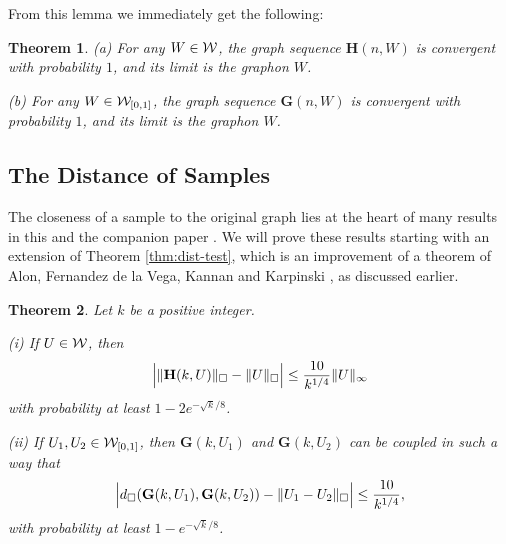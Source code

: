 \documentclass[12pt]{article}
\newtheorem{theorem}{Theorem}[section]
\numberwithin{equation}{section}
\def\bG{{\mathbf G}}
\def\bH{{\mathbf H}}
\def\WWz{{\WW_{[0,1]}}}
\begin{document}
From this lemma we immediately get the following:

\begin{theorem}\label{WRAND-CONV}
{\rm (a)} For any $W\in{\cal W}$, the graph sequence $\bH(n,W)$ is
convergent with probability $1$, and its limit is the graphon $W$.



{\rm (b)} For any $W\in\WWz$, the graph sequence $\bG(n,W)$ is
convergent with probability $1$, and its limit is the graphon $W$.
\end{theorem}


\subsection{The Distance of Samples}
\label{sec:dist-sample-W}



The closeness of a sample to the original graph lies at the heart of
many results in this and the companion paper \cite{dense2}.  We will
prove these results starting with an extension of Theorem
\ref{thm:dist-test}, which is an improvement of a theorem of Alon,
Fernandez de la Vega, Kannan and Karpinski \cite{AFKK,AFKK-Stoc},
as discussed earlier.

\begin{theorem}\label{thm:NormSample}
Let $k$ be a positive integer.

\smallskip

{\rm (i)} If $U\in{\cal W}$, then
\begin{equation}
\label{ProbH-UpBd}
\Bigl|\|\bH(k,U)\|_\square -\|U\|_\square\Bigr|
\leq \frac {10} {k^{1/4}}\|U\|_\infty
\end{equation}
with probability at least $1-2e^{-\sqrt k/8}$.

\smallskip

{\rm (ii)} If $U_1,U_2\in\WWz$, then $\bG(k,U_1)$ and $\bG(k,U_2)$
can be coupled in such a way that
\begin{equation}
\label{ProbG1G2-diff}
\Bigl|
d_\square(\bG(k,U_1),\bG(k,U_2))-\|U_1-U_2\|_\square
\Bigr|\leq \frac{10}{k^{1/4}},
\end{equation}
with probability at least $1-e^{-\sqrt k/8}$.
\end{theorem}
\end{document}

